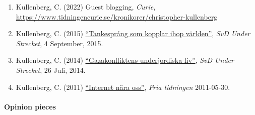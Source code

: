 \documentclass[
]{article}
\providecommand{\tightlist}{%
  \setlength{\itemsep}{0pt}\setlength{\parskip}{0pt}}
\begin{document}
\begin{enumerate}
\def\labelenumi{\arabic{enumi}.}
\tightlist
\item
  Kullenberg, C. (2022) Guest blogging, \emph{Curie},
  \url{https://www.tidningencurie.se/kronikorer/christopher-kullenberg}
\item
  Kullenberg, C. (2015)
  \href{http://www.svd.se/tankesprang-som-kopplar-ihop-varlden}{``Tankesprång
  som kopplar ihop världen''}, \emph{SvD Under Strecket}, 4 September,
  2015.
\item
  Kullenberg, C. (2014)
  \href{http://www.svd.se/kultur/understrecket/gazakonfliktens-underjordiska-liv_3776810.svd}{``Gazakonfliktens
  underjordiska liv''}, \emph{SvD Under Strecket}, 26 Juli, 2014.
\item
  Kullenberg, C. (2011)
  \href{http://www.fria.nu/artikel/88431}{``Internet nära oss''},
  \emph{Fria tidningen} 2011-05-30.
\end{enumerate}

\hypertarget{opinion-pieces}{%
\paragraph{Opinion pieces}\label{opinion-pieces}}
\end{document}
